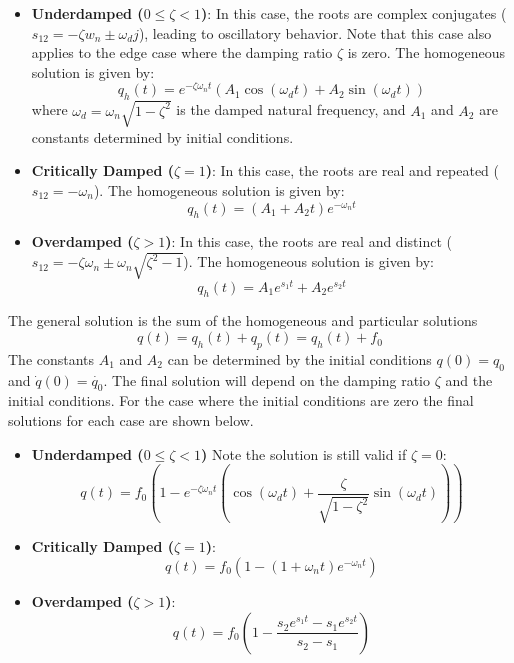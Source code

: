 \begin{itemize}
    \item {\bf Underdamped ($0 \leq \zeta<1$)}: In this case, the roots are complex conjugates ($s_{12}=-\zeta w_n \pm \omega_d j$), leading to oscillatory behavior. Note that this case also applies to the edge case where the damping ratio $\zeta$ is zero. The homogeneous solution is given by:
    \begin{equation}
        q_h(t) = e^{-\zeta \omega_n t} \left( A_1 \cos(\omega_d t) + A_2 \sin(\omega_d t) \right)
    \end{equation}
    where $\omega_d = \omega_n \sqrt{1 - \zeta^2}$ is the damped natural frequency, and $A_1$ and $A_2$ are constants determined by initial conditions.

    \item {\bf Critically Damped ($\zeta=1$)}: In this case, the roots are real and repeated ($s_{12}=-\omega_n$). The homogeneous solution is given by:
    \begin{equation}
        q_h(t) = (A_1 + A_2 t) e^{-\omega_n t}
    \end{equation}

    \item {\bf Overdamped ($\zeta>1$)}: In this case, the roots are real and distinct ($s_{12}=-\zeta \omega_n \pm \omega_n \sqrt{\zeta^2-1}$). The homogeneous solution is given by:
    \begin{equation}
        q_h(t) = A_1 e^{s_1 t} + A_2 e^{s_2 t}
    \end{equation}
\end{itemize}
The general solution is the sum of the homogeneous and particular solutions
\begin{equation}
    q(t) = q_h(t) + q_p(t) = q_h(t) + f_0
\end{equation}
The constants $A_1$ and $A_2$ can be determined by the initial conditions $q(0)=q_0$ and $\dot{q}(0)=\dot{q_0}$. The final solution will depend on the damping ratio $\zeta$ and the initial conditions. For the case where the initial conditions are zero the final solutions for each case are shown below.
\begin{itemize}
    \item {\bf Underdamped ($0 \leq \zeta<1$)} Note the solution is still valid if $\zeta=0$:
    \begin{equation}
        q(t) = f_0 \left( 1 - e^{-\zeta \omega_n t} \left( \cos(\omega_d t) + \frac{\zeta}{\sqrt{1-\zeta^2}} \sin(\omega_d t) \right) \right)
    \end{equation}
    \item {\bf Critically Damped ($\zeta=1$)}:
    \begin{equation}
        q(t) = f_0 \left( 1 - (1 + \omega_n t) e^{-\omega_n t} \right)
    \end{equation}
    \item {\bf Overdamped ($\zeta>1$)}:
    \begin{equation}
        q(t) = f_0 \left( 1 - \frac{s_2 e^{s_1 t} - s_1 e^{s_2 t}}{s_2 - s_1} \right)
    \end{equation}
\end{itemize}
